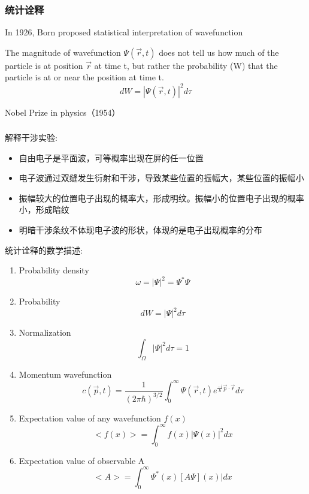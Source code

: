 \begin{frame}
    \frametitle{统计诠释}
    In 1926, Born proposed statistical interpretation of wavefunction
    \begin{tcolorbox4}
        \large The magnitude of wavefunction $\Psi(\vec{r},t)$ does not tell us how much of 
        the particle is at position $\vec{r}$ at time t, 
        but rather the probability (W) that the particle is at or near the position at time t. \\
        \[ d W = |\Psi(\vec{r},t)|^2 d \tau \]
    \end{tcolorbox4}
    {\color{deepred} Nobel Prize in physics（1954）}
\end{frame}

\begin{frame}
    \frametitle{}
    解释干涉实验:
    \begin{itemize}
        \item 自由电子是平面波，可等概率出现在屏的任一位置
        \item 电子波通过双缝发生衍射和干涉，导致某些位置的振幅大，某些位置的振幅小
        \item 振幅较大的位置电子出现的概率大，形成明纹。振幅小的位置电子出现的概率小，形成暗纹
        \item 明暗干涉条纹不体现电子波的形状，体现的是电子出现概率的分布
    \end{itemize}  
\end{frame}

\begin{frame}[allowframebreaks=]
    统计诠释的数学描述:
    \begin{enumerate}
        \item Probability density \[\omega = |\Psi|^2 =\Psi^* \Psi \]
        \item Probability  \[ d W = |\Psi|^2 d \tau \]
        \item Normalization \[ \int_{\Omega} |\Psi|^2 d \tau =1 \]
        \item Momentum wavefunction \[ c(\vec{p},t)=\frac{1}{(2\pi\hbar)^{3/2}} \int_{0}^{\infty} \Psi(\vec{r},t) e^{\frac{-i}{\hbar} \vec{p}\cdot \vec{r} } d \tau \] 
        \item Expectation value of any wavefunction $f (x)$  \[ <f(x)>=\int_{0}^{\infty} f(x) |\Psi(x)|^2 dx \]
        \item Expectation value of observable A \[ <A>=\int_{0}^{\infty} \Psi^*(x) [A \Psi](x)| dx \]
    \end{enumerate}
\end{frame}


